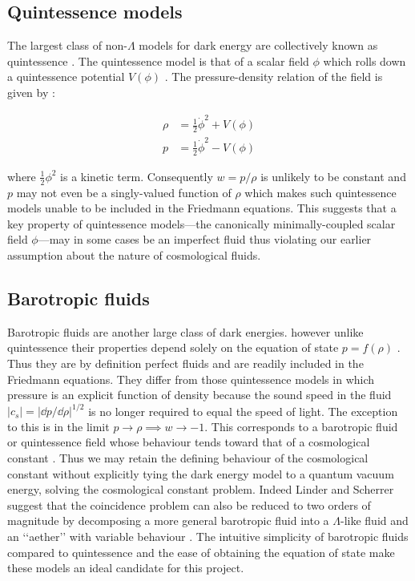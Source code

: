 \subsection{Quintessence models}
\label{subsec:quintessence-models}

The largest class of non-$\Lambda$ models for dark energy are collectively known as quintessence \cite{Olive2010}. The quintessence model is that of a scalar field $\phi$ which rolls down a quintessence potential $V(\phi)$ \cite{Barnes2005}. The pressure-density relation of the field is given by \cite{Olive2010}:

\begin{subequations} \label{eq:1.7}
\begin{align}
    \label{eq:quintessence-density} \rho &= \frac{1}{2} \dot{\phi}^{2} + V(\phi{}) \\
    \label{eq:quintessence-pressure} p &= \frac{1}{2} \dot{\phi}^{2} - V(\phi{})
\end{align}
\end{subequations}

where $\frac{1}{2} \phi^2$ is a kinetic term. Consequently $w = p/\rho$ is unlikely to be constant \cite{Olive2010} and $p$ may not even be a singly-valued function of $\rho$ \cite{LinderScherrer2009} which makes such quintessence models unable to be included in the Friedmann equations. This suggests that a key property of quintessence models---the canonically minimally-coupled scalar field $\phi$---may in some cases be an imperfect fluid \cite{LinderScherrer2009} thus violating our earlier assumption about the nature of cosmological fluids.

\subsection{Barotropic fluids}
\label{subsec:barotropic-fluids}

Barotropic fluids are another large class of dark energies.  however unlike quintessence their properties depend solely on the equation of state $p = f(\rho)$ \cite{LinderScherrer2009}. Thus they are by definition perfect fluids and are readily included in the Friedmann equations. They differ from those quintessence models in which pressure is an explicit function of density because the sound speed in the fluid $|c_s| = |\dd{p}/\dd{\rho}|^{1/2}$ is no longer required to equal the speed of light. The exception to this is in the limit $p \rightarrow \rho \implies w \rightarrow -1$. This corresponds to a barotropic fluid or quintessence field whose behaviour tends toward that of a cosmological constant \cite{LinderScherrer2009}. Thus we may retain the defining behaviour of the cosmological constant without explicitly tying the dark energy model to a quantum vacuum energy, solving the cosmological constant problem. Indeed Linder and Scherrer suggest that the coincidence problem can also be reduced to two orders of magnitude by decomposing a more general barotropic fluid into a $\Lambda$-like fluid and an \lq\lq{}aether\rq\rq{} with variable behaviour \cite{LinderScherrer2009}. The intuitive simplicity of barotropic fluids compared to quintessence and the ease of obtaining the equation of state make these models an ideal candidate for this project.

